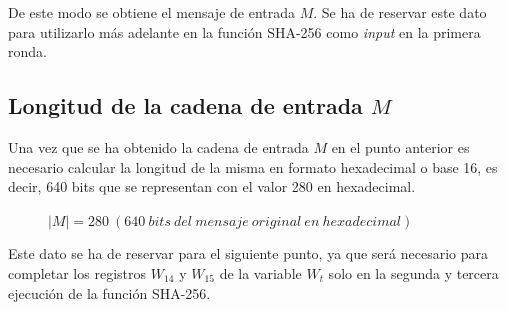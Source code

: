 \documentclass{article}
\begin{document}
    De este modo se obtiene el mensaje de entrada $M$. Se ha de reservar este dato para utilizarlo más adelante en la función SHA-256 como \textit{input} en la primera ronda.
    
    \subsection{Longitud de la cadena de entrada $M$}
        Una vez que se ha obtenido la cadena de entrada $M$ en el punto anterior es necesario calcular la longitud de la misma en formato hexadecimal o base 16, es decir, 640 bits que se representan con el valor 280 en hexadecimal.
        \begin{figure}[H]
        \centering
            $|M| = 280\ (640\ bits\ del\ mensaje\ original\ en\ hexadecimal)$
        \end{figure}
        Este dato se ha de reservar para el siguiente punto, ya que será necesario para completar los registros $W_{14}$ y $W_{15}$ de la variable $W_t$ solo en la segunda y tercera ejecución de la función SHA-256.
    
\end{document}
